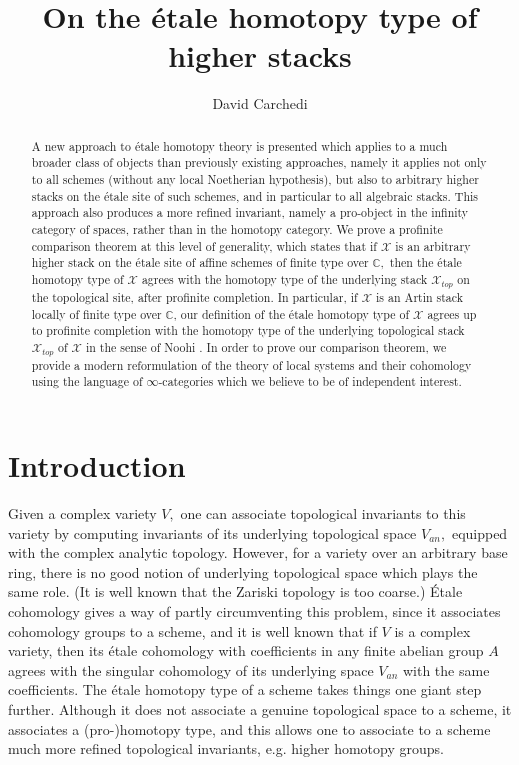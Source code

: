 \documentclass[12pt]{amsart}
\theoremstyle{definition}
\newcommand{\bC}{\mathbb{C}}
\newcommand{\cX}{\mathcal{X}}
\renewcommand{\i}{\infty}
\begin{document}
\title[On the \'etale homotopy type of higher stacks]
{On the \'etale homotopy type of higher stacks}





\author{David Carchedi}

\maketitle

\begin{abstract}
A new approach to \'etale homotopy theory is presented which applies to a much broader class of objects than previously existing approaches, namely it applies not only to all schemes (without any local Noetherian hypothesis), but also to arbitrary higher stacks on the \'etale site of such schemes, and in particular to all algebraic stacks. This approach also produces a more refined invariant, namely a pro-object in the infinity category of spaces, rather than in the homotopy category. We prove a profinite comparison theorem at this level of generality, which states that if $\cX$ is an arbitrary higher stack on the \'etale site of affine schemes of finite type over $\bC,$ then the \'etale homotopy type of $\cX$ agrees with the homotopy type of the underlying stack $\cX_{top}$ on the topological site, after profinite completion. In particular, if $\cX$ is an Artin stack locally of finite type over $\bC$, our definition of the \'etale homotopy type of $\cX$ agrees up to profinite completion with the homotopy type of the underlying topological stack $\cX_{top}$ of $\cX$ in the sense of Noohi \cite{No1}. In order to prove our comparison theorem, we provide a modern reformulation of the theory of local systems and their cohomology using the language of $\i$-categories which we believe to be of independent interest.
\end{abstract}

\section{Introduction}

Given a complex variety $V,$ one can associate topological invariants to this variety by computing invariants of its underlying topological space $V_{an},$ equipped with the complex analytic topology. However, for a variety over an arbitrary base ring, there is no good notion of underlying topological space which plays the same role. (It is well known that the Zariski topology is too coarse.) \'Etale cohomology gives a way of partly circumventing this problem, since it associates cohomology groups to a scheme, and it is well known that if $V$ is a complex variety, then its \'etale cohomology with coefficients in any finite abelian group $A$ agrees with the singular cohomology of its underlying space $V_{an}$ with the same coefficients. The \'etale homotopy type of a scheme takes things one giant step further. Although it does not associate a genuine topological space to a scheme, it associates a (pro-)homotopy type, and this allows one to associate to a scheme much more refined topological invariants, e.g. higher homotopy groups.
\end{document}
